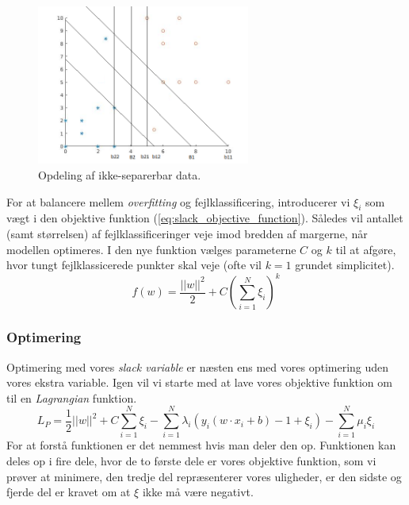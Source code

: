 \documentclass{article}
\begin{document}
\begin{figure}[H]
	\begin{center} 
		\includegraphics[width=7cm]{svm_plot_1}
	\end{center}
	\caption{Opdeling af ikke-separerbar data.}
	\label{fig:separable-data-slack}
\end{figure}

For at balancere mellem \textit{overfitting} og fejlklassificering, introducerer vi $\xi_i$ som vægt i den objektive funktion (\ref{eq:slack_objective_function}). Således vil antallet (samt størrelsen) af fejlklassificeringer veje imod bredden af margerne, når modellen optimeres. I den nye funktion vælges parameterne $C$ og $k$ til at afgøre, hvor tungt fejlklassicerede punkter skal veje (ofte vil $k = 1$ grundet simplicitet).
\begin{equation}
\label{eq:slack_objective_function}
f(w) = \frac{||w||^2}{2}+C(\sum\limits_{i=1}^N \xi_i)^k
\end{equation}

\subsubsection{Optimering}
Optimering med vores \textit{slack variable} er næsten ens med vores optimering uden vores ekstra variable. Igen vil vi starte med at lave vores objektive funktion om til en \textit{Lagrangian} funktion.
\begin{equation}
\label{eq:slack_L_P}
L_P = \frac{1}{2}||w||^2 + C \sum\limits_{i=1}^N \xi_i - \sum\limits_{i=1}^N \lambda_i (y_i(w \cdot x_i + b) - 1 + \xi_i) - \sum\limits_{i=1}^N \mu_i \xi_i
\end{equation}
For at forstå funktionen er det nemmest hvis man deler den op. Funktionen kan deles op i fire dele, hvor de to første dele er vores objektive funktion, som vi prøver at minimere, den tredje del  repræsenterer vores uligheder, er den sidste og fjerde del er kravet om at $\xi$ ikke må være negativt. 
\end{document}
